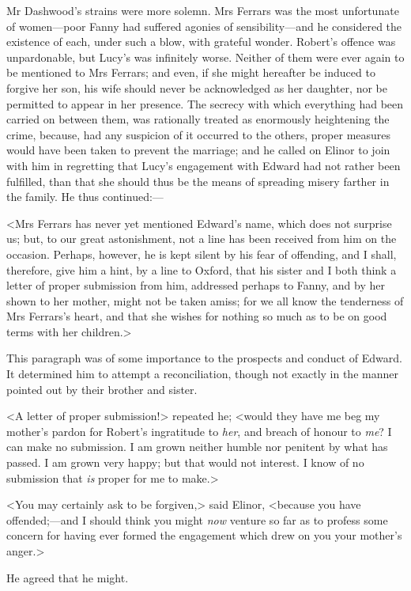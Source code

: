 Mr Dashwood's strains were more solemn. Mrs Ferrars was the most unfortunate of women—poor Fanny had suffered agonies of sensibility—and he considered the existence of each, under such a blow, with grateful wonder. Robert's offence was unpardonable, but Lucy's was infinitely worse. Neither of them were ever again to be mentioned to Mrs Ferrars; and even, if she might hereafter be induced to forgive her son, his wife should never be acknowledged as her daughter, nor be permitted to appear in her presence. The secrecy with which everything had been carried on between them, was rationally treated as enormously heightening the crime, because, had any suspicion of it occurred to the others, proper measures would have been taken to prevent the marriage; and he called on Elinor to join with him in regretting that Lucy's engagement with Edward had not rather been fulfilled, than that she should thus be the means of spreading misery farther in the family. He thus continued:—

<Mrs Ferrars has never yet mentioned Edward's name, which does not surprise us; but, to our great astonishment, not a line has been received from him on the occasion. Perhaps, however, he is kept silent by his fear of offending, and I shall, therefore, give him a hint, by a line to Oxford, that his sister and I both think a letter of proper submission from him, addressed perhaps to Fanny, and by her shown to her mother, might not be taken amiss; for we all know the tenderness of Mrs Ferrars's heart, and that she wishes for nothing so much as to be on good terms with her children.>

This paragraph was of some importance to the prospects and conduct of Edward. It determined him to attempt a reconciliation, though not exactly in the manner pointed out by their brother and sister.

<A letter of proper submission!> repeated he; <would they have me beg my mother's pardon for Robert's ingratitude to \textit{her}, and breach of honour to \textit{me}? I can make no submission. I am grown neither humble nor penitent by what has passed. I am grown very happy; but that would not interest. I know of no submission that \textit{is} proper for me to make.>

<You may certainly ask to be forgiven,> said Elinor, <because you have offended;—and I should think you might \textit{now} venture so far as to profess some concern for having ever formed the engagement which drew on you your mother's anger.>

He agreed that he might.


